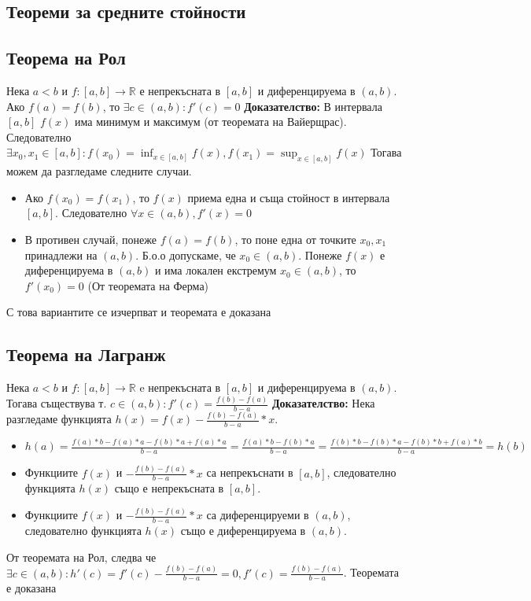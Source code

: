 \documentclass[fleqn,12pt]{article}
\begin{document}
\begin{flushleft}
\section{Теореми  за  средните  стойности}
\subsection{Теорема на Рол}
Нека $a<b$ и $f:[a,b]\rightarrow\mathbb{R}$ е непрекъсната в $[a,b]$ и диференцируема в $(a,b)$. Ако $f(a) = f(b)$, то $\exists c \in (a,b): f'(c)=0$
\bigbreak
\textbf{Доказателство:}
В интервала $[a,b]$ $f(x)$ има минимум и максимум (от теоремата на Вайерщрас).
Следователно $\exists x_0,x_1 \in [a,b]: f(x_0)=\inf_{x \in [a,b]} f(x), f(x_1)=\sup_{x \in [a,b]} f(x)$
Тогава можем да разгледаме следните случаи.
\begin{itemize}
    \item Ако $f(x_0) = f(x_1)$, то $f(x)$ приема една и съща стойност в интервала $[a,b]$. Следователно $\forall x \in (a,b), f'(x)=0$ 

    \item В противен случай, понеже $f(a) = f(b)$, то поне една от точките $x_0,x_1$ принадлежи на $(a,b)$. Б.о.о допускаме, че $x_0 \in (a,b)$. Понеже $f(x)$ е диференцируема в $(a,b)$ и има локален екстремум $x_0 \in (a,b)$, то $f'(x_0) = 0$ (От теоремата на Ферма) 
\end{itemize}
С това вариантите се изчерпват и теоремата е доказана

\subsection{Теорема на Лагранж}
Нека $a<b$ и $f:[a,b]\rightarrow\mathbb{R}$ e непрекъсната в $[a,b]$ и диференцируема в $(a,b)$.
Тогава съществува т. $c \in (a,b): f'(c) = \frac{f(b)-f(a)}{b-a}$
\bigbreak
\textbf{Доказателство:}
Нека разгледаме функцията $h(x)=f(x) - \frac{f(b)-f(a)}{b-a}*x$. 
\begin{itemize}
    \item $h(a)=\frac{f(a)*b - f(a)*a - f(b)*a + f(a)*a}{b-a} = \frac{f(a)*b-f(b)*a}{b-a} = \frac{f(b)*b - f(b)*a - f(b)*b + f(a)*b}{b-a} = h(b)$
    \item Функциите $f(x)$ и $-\frac{f(b)-f(a)}{b-a}*x$ са непрекъснати в $[a,b]$, следователно функцията $h(x)$ също е непрекъсната в $[a,b]$.
    \item Функциите $f(x)$ и $-\frac{f(b)-f(a)}{b-a}*x$ са диференцируеми в $(a,b)$, следователно функцията $h(x)$ също е диференцируема в $(a,b)$.
\end{itemize}
От теоремата на Рол, следва че $\exists c \in (a,b): h'(c) = f'(c) - \frac{f(b)-f(a)}{b-a} = 0, f'(c) = \frac{f(b)-f(a)}{b-a}$.
Теоремата е доказана


\end{flushleft}
\end{document}
